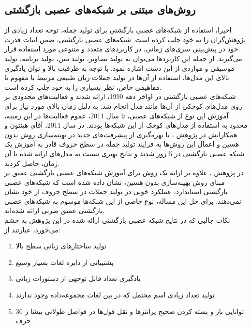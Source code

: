 %
%
\subsection{روش‌های مبتنی بر شبکه‌های عصبی بازگشتی}
اخیرا، استفاده از شبکه‌های عصبی بازگشتی برای تولید جمله، توجه تعداد زیادی از پژوهش‌گران را به خود جلب کرده است. شبکه‌های عصبی بازگشتی، ضمن اثبات قدرت خود در پیش‌بینی سری‌های زمانی، در کاربردهای متعدد و متنوعی مورد استفاده قرار می‌گیرند. از جمله این کاربردها می‌توان به تولید تصاویر، تولید متن، تولید برنامه، تولید موسیقی و مواردی از این دست اشاره نمود. با توجه به ظرفیت بالا و توان یادگیری بالای این مدل‌ها، استفاده از آن‌ها در تولید جملات زبان طبیعی مرتبط با مفهوم یا مفاهیمی خاص، نظر بسیاری را به خود جلب کرده است.
\\
شبکه‌های عصبی بازگشتی در اواخر دهه 1990، ارائه شدند و فعالیت‌های محدودی بر روی مدل‌های کوچکی از ‌آن‌ها مانند مدل  انجام شد. به دلیل زمان بالای مورد نیاز برای آموزش این نوع از شبکه‌های عصبی، تا سال 2011، عموم فعالیت‌ها در این زمینه، محدود به استفاده از مدل‌های کوچک از این شبکه‌ها بودند. در سال 2011، آقای هینتون و همکارانش در پژوهش \cite{sutskever2011generating}، با بهره‌گیری از پیشرفت‌های جدید در بهینه‌سازی روش بدون هسین و اعمال این روش‌ها به فرایند تولید جمله در سطح حروف قادر به آموزش یک شبکه عصبی بازگشتی در 5 روز شدند و نتایج بهتری نسبت به مدل‌های ارائه شده تا آن زمان، حاصل کردند.
\\
در پژوهش \cite{sutskever2011generating}، علاوه بر ارائه یک روش برای آموزش شبکه‌های عصبی بازگشتی عمیق بر مبنای روش بهینه‌سازی بدون هسین، نشان داده شده است که شبکه‌های عصبی بازگشتی استاندارد، عملکرد خوبی در تولید جملات در سطح حروف از خود نشان نمی‌دهند. برای حل این مساله، نوع خاصی از این شبکه‌ها موسوم به شبکه‌های عصبی بازگشتی عمیق ضربی ارائه شده‌اند.
\\
نکات جالبی که در نتایج شبکه عصبی بازگشتی ارائه شده در این پژوهش به چشم می‌خورد، عبارتند از:
\begin{enumerate}
\item تولید ساختارهای زبانی سطح بالا
\item پشتیبانی از دایره لغات بسیار وسیع
\item یادگیری تعداد قابل توجهی از دستورات زبانی
\item تولید تعداد زیادی اسم محتمل که در بین لغات مجموعه‌داده وجود ندارند
\item توانایی باز و بسته کردن صحیح پرانتزها و نقل قول‌ها در فواصل طولانی بیشا ز 30 حرف
\end{enumerate}

